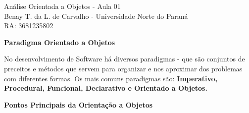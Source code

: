\documentclass[12pt, a4paper]{article}
\begin{document}
\begin{center}
    
    {\LARGE
        Análise Orientada a Objetos - Aula 01\\
    }
    {\Large
        Benay T. da L. de Carvalho - Universidade Norte do Paraná\\
        RA: 3681235802
    }

\end{center}

\vspace{1cm}

\large
\noindent
\textbf{Paradigma Orientado a Objetos}

No desenvolvimento de Software há diversos paradigmas - que são conjuntos de preceitos e métodos que servem para organizar e nos aproximar dos problemas com diferentes formas.
Os mais comuns paradigmas são: \textbf{Imperativo, Procedural, Funcional, Declarativo e Orientado a Objetos.}

\vspace*{0.5cm}

{\setlength{\parindent}{0cm}
    \textbf{Pontos Principais da Orientação a Objetos}
}
\end{document}
